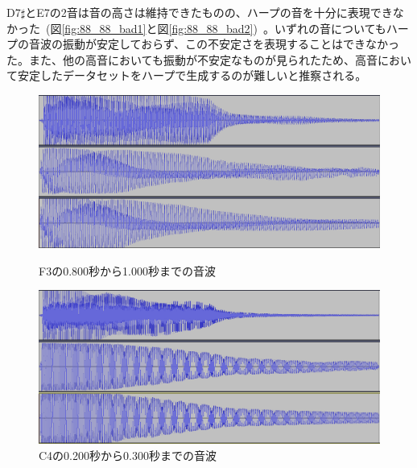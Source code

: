 D7$\sharp$とE7の2音は音の高さは維持できたものの、ハープの音を十分に表現できなかった~(図\ref{fig:88_88_bad1}と図\ref{fig:88_88_bad2})~。いずれの音についてもハープの音波の振動が安定しておらず、この不安定さを表現することはできなかった。また、他の高音においても振動が不安定なものが見られたため、高音において安定したデータセットをハープで生成するのが難しいと推察される。

\begin{figure}[b]
\begin{center}
\begin{minipage}{0.48\hsize}
\begin{center}
\includegraphics[width=0.9\hsize]{figure/88_88/f3.png}
\caption{F3の0.800秒から1.000秒までの音波}
\label{fig:88_88_good1}
\end{center}
\end{minipage}
\begin{minipage}{0.48\hsize}
\begin{center}
\includegraphics[width=0.9\hsize]{figure/88_88/c4.png}
\caption{C4の0.200秒から0.300秒までの音波}
\label{fig:88_88_good2}
\end{center}
\end{minipage}
\end{center}
\end{figure}

